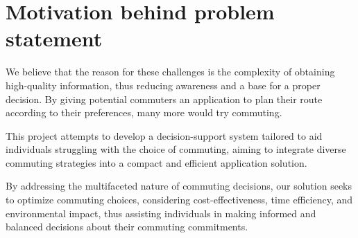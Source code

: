 \section{Motivation behind problem statement}\label{sec:motivation-behind-problem-statement}

We believe that the reason for these challenges is the complexity of obtaining high-quality information, thus reducing
awareness and a base for a proper decision.
By giving potential commuters an application to plan their route according to their preferences, many more would try
commuting.

This project attempts to develop a decision-support system tailored to aid individuals struggling with the choice of
commuting, aiming to integrate diverse commuting strategies into a compact and efficient application solution.

By addressing the multifaceted nature of commuting decisions, our solution seeks to optimize commuting choices,
considering cost-effectiveness, time efficiency, and environmental impact, thus assisting individuals in making
informed and balanced decisions about their commuting commitments.
